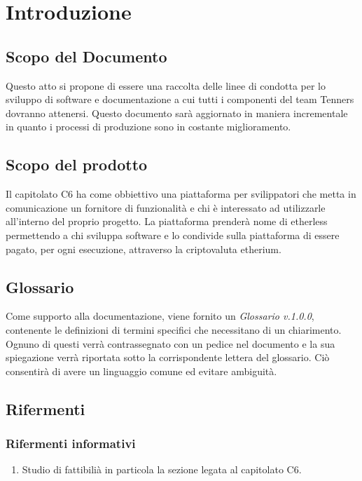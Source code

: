 \section{Introduzione}

\subsection{Scopo del Documento}
Questo atto si propone di essere una raccolta delle linee di condotta per lo
sviluppo di software e documentazione a cui tutti i componenti del team Tenners
dovranno attenersi.
Questo documento sar\`a aggiornato in maniera incrementale in quanto i processi
di produzione sono in costante miglioramento.

\subsection{Scopo del prodotto}
Il capitolato C6 ha come obbiettivo una piattaforma per svilippatori che metta
in comunicazione un fornitore di funzionalit\`a e chi \`e interessato ad utilizzarle
all'interno del proprio progetto.
La piattaforma prender\`a nome di etherless permettendo a chi sviluppa software e
lo condivide sulla piattaforma di essere pagato, per ogni esecuzione, attraverso
la criptovaluta etherium.


\subsection{Glossario}
Come supporto alla documentazione, viene fornito un \textit{Glossario v.1.0.0},
contenente le definizioni di termini specifici che necessitano di un chiarimento.
Ognuno di questi verr\`a contrassegnato con un pedice \glo nel documento e la sua
spiegazione verr\`a riportata sotto la corrispondente lettera del glossario. Ci\`o
consentir\`a di avere un linguaggio comune ed evitare ambiguit\`a.

\subsection{Rifermenti}
\subsubsection{Rifermenti informativi}
\begin{enumerate}
  \item Studio di fattibili\`a in particola la sezione legata al capitolato C6.
\end{enumerate}
